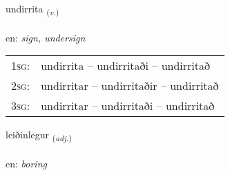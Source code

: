 \documentclass[frontgrid, backgrid]{flacards}\usepackage[]{graphicx}\usepackage[]{color}
\begin{document}
\renewcommand{\flhead}{\vskip5pt \fboxsep=0pt {\small\bfseries\footnotesize Sagnorð | Verb}}
\renewcommand{\fcfoot}{\vskip5pt \fboxsep=0pt \hspace{2pt}{\small\bfseries\footnotesize 2K}}

\renewcommand{\blhead}{\vskip5pt {\small\bfseries\footnotesize Sagnorð | Verb }}
\renewcommand{\bcfoot}{\vskip5pt \hspace{2pt}{\small\bfseries\footnotesize 2K}}


{undirrita \small{\textsubscript{(\textit{v.})}} \\[1ex] %
\textphonetic{[ʏntɪrɪta]} \\
en: \emph{sign, undersign} \\  [2ex]
\renewcommand*{\arraystretch}{0.8}
\begin{tabular}{p{1cm}l}
\textsc{1sg}: & undirrita -- undirritaði -- undirritað \\ 
\textsc{2sg}: & undirritar -- undirritaðir -- undirritað \\ 
\textsc{3sg}: & undirritar -- undirritaði -- undirritað \\ 
\end{tabular}
}

\renewcommand{\flhead}{\vskip5pt \fboxsep=0pt {\small\bfseries\footnotesize Lýsingarorð | Adjective}}
\renewcommand{\fcfoot}{\vskip5pt \fboxsep=0pt \hspace{2pt}{\small\bfseries\footnotesize 2K}}

\renewcommand{\blhead}{\vskip5pt {\small\bfseries\footnotesize Lýsingarorð | Adjective }}
\renewcommand{\bcfoot}{\vskip5pt \hspace{2pt}{\small\bfseries\footnotesize 2K}}


{leiðinlegur \small{\textsubscript{(\textit{adj.})}} \\[1ex] %
\textphonetic{[leiːðɪnlɛɣʏr]} \\
en: \emph{boring} \\  [2ex]
\renewcommand*{\arraystretch}{0.8}
}
\end{document}
